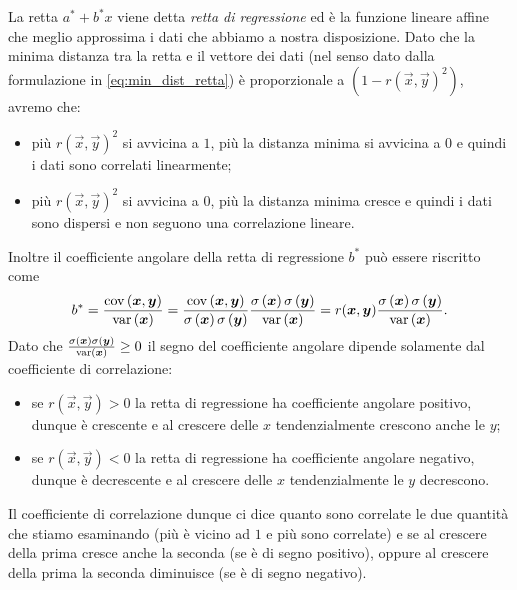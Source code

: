 La retta $a^\ast + b^\ast x$ viene detta \emph{retta di regressione} ed è la funzione lineare affine che meglio approssima i dati che abbiamo a nostra disposizione. Dato che la minima distanza tra la retta e il vettore dei dati (nel senso dato dalla formulazione in \eqref{eq:min_dist_retta}) è proporzionale a $\left(1 - r(\vec x, \vec y)^2\right)$, avremo che: \begin{itemize}
    \item più $r(\vec x, \vec y)^2$ si avvicina a $1$, più la distanza minima si avvicina a $0$ e quindi i dati sono correlati linearmente;
    \item più $r(\vec x, \vec y)^2$ si avvicina a $0$, più la distanza minima cresce e quindi i dati sono dispersi e non seguono una correlazione lineare.
\end{itemize}
Inoltre il coefficiente angolare della retta di regressione $b^\ast$ può essere riscritto come \[
    b^\ast = \frac{\cov{\vec x, \vec y}}{\var{\vec x}} = \frac{\cov{\vec x, \vec y}}{\sd{\vec x}\sd{\vec y}}\frac{\sd{\vec x}\sd{\vec y}}{\var{\vec x}} = r(\vec x, \vec y)\frac{\sd{\vec x}\sd{\vec y}}{\var{\vec x}}.
\] Dato che $\frac{\sd{\vec x}\sd{\vec y}}{\var{\vec x}} \geq 0$ il segno del coefficiente angolare dipende solamente dal coefficiente di correlazione: \begin{itemize}
    \item se $r(\vec x, \vec y) > 0$ la retta di regressione ha coefficiente angolare positivo, dunque è crescente e al crescere delle $x$ tendenzialmente crescono anche le $y$;
    \item se $r(\vec x, \vec y) < 0$ la retta di regressione ha coefficiente angolare negativo, dunque è decrescente e al crescere delle $x$ tendenzialmente le $y$ decrescono.
\end{itemize}

Il coefficiente di correlazione dunque ci dice quanto sono correlate le due quantità che stiamo esaminando (più è vicino ad $1$ e più sono correlate) e se al crescere della prima cresce anche la seconda (se è di segno positivo), oppure al crescere della prima la seconda diminuisce (se è di segno negativo).